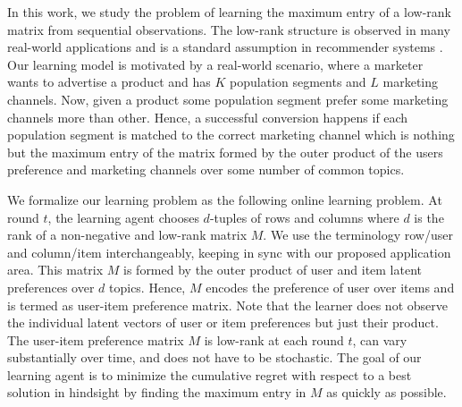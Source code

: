 In this work, we study the problem of learning the maximum entry of a low-rank matrix from sequential observations. The low-rank structure is observed in many real-world applications and is a standard assumption in recommender systems \citep{koren2009matrix,ricci2011liorrokach}. Our learning model is motivated by a real-world scenario, where a marketer wants to advertise a product and has $K$ population segments and $L$ marketing channels. Now, given a product some population segment prefer some marketing channels more than other.  Hence, a successful conversion happens if each population segment is matched to the correct marketing channel which is nothing but the maximum entry of the matrix formed by the outer product of the users preference and marketing channels over some number of common topics.  

We formalize our learning problem as the following online learning problem. At round $t$, the learning agent chooses $d$-tuples of rows and columns where $d$ is the rank of a non-negative and low-rank matrix $M$. We use the terminology row/user and column/item interchangeably, keeping in sync with our proposed application area. This matrix $M$ is formed by the outer product of user and item latent preferences over $d$ topics. Hence, $M$ encodes the preference of user over items and is termed as user-item preference matrix. Note that the learner does not observe the individual latent vectors of user or item preferences but just their product. The user-item preference matrix $M$ is low-rank at each round $t$, can vary substantially over time, and does not have to be stochastic. The goal of our learning agent is to minimize the cumulative regret with respect to a best solution in hindsight by finding the maximum entry in $M$ as quickly as possible.

